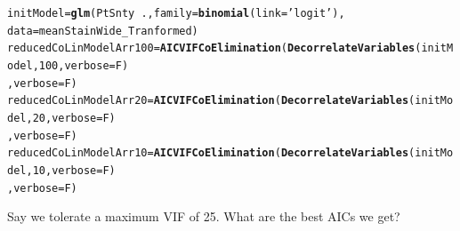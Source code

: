 \documentclass[a4paper]{article}\usepackage[]{graphicx}\usepackage[]{color}
\makeatletter
\newcommand{\hlnum}[1]{\textcolor[rgb]{0.686,0.059,0.569}{#1}}%
\newcommand{\hlstr}[1]{\textcolor[rgb]{0.192,0.494,0.8}{#1}}%
\newcommand{\hlopt}[1]{\textcolor[rgb]{0,0,0}{#1}}%
\newcommand{\hlstd}[1]{\textcolor[rgb]{0.345,0.345,0.345}{#1}}%
\newcommand{\hlkwb}[1]{\textcolor[rgb]{0.69,0.353,0.396}{#1}}%
\newcommand{\hlkwc}[1]{\textcolor[rgb]{0.333,0.667,0.333}{#1}}%
\newcommand{\hlkwd}[1]{\textcolor[rgb]{0.737,0.353,0.396}{\textbf{#1}}}%
\newenvironment{kframe}{%
 \def\at@end@of@kframe{}%
 \ifinner\ifhmode%
  \def\at@end@of@kframe{\end{minipage}}%
  \begin{minipage}{\columnwidth}%
 \fi\fi%
 \def\FrameCommand##1{\hskip\@totalleftmargin \hskip-\fboxsep
 \colorbox{shadecolor}{##1}\hskip-\fboxsep
     \hskip-\linewidth \hskip-\@totalleftmargin \hskip\columnwidth}%
 \MakeFramed {\advance\hsize-\width
   \@totalleftmargin\z@ \linewidth\hsize
   \@setminipage}}%
 {\par\unskip\endMakeFramed%
 \at@end@of@kframe}
\newenvironment{knitrout}{}{} %
\makeatother
\begin{document}
\begin{knitrout}
\color{fgcolor}\begin{kframe}
\begin{alltt}
\hlstd{initModel} \hlkwb{=} \hlkwd{glm}\hlstd{(PtSnty} \hlopt{~}\hlstd{.,}\hlkwc{family}\hlstd{=}\hlkwd{binomial}\hlstd{(}\hlkwc{link}\hlstd{=}\hlstr{'logit'}\hlstd{),}
                           \hlkwc{data}\hlstd{=meanStainWide_Tranformed)}
\hlstd{reducedCoLinModelArr100} \hlkwb{=} \hlkwd{AICVIFCoElimination}\hlstd{(}\hlkwd{DecorrelateVariables}\hlstd{(initModel,}\hlnum{100}\hlstd{,}\hlkwc{verbose}\hlstd{=F)}
                                              \hlstd{,}\hlkwc{verbose}\hlstd{=F)}
\hlstd{reducedCoLinModelArr20} \hlkwb{=} \hlkwd{AICVIFCoElimination}\hlstd{(}\hlkwd{DecorrelateVariables}\hlstd{(initModel,}\hlnum{20}\hlstd{,}\hlkwc{verbose}\hlstd{=F)}
                                             \hlstd{,}\hlkwc{verbose}\hlstd{=F)}
\hlstd{reducedCoLinModelArr10} \hlkwb{=} \hlkwd{AICVIFCoElimination}\hlstd{(}\hlkwd{DecorrelateVariables}\hlstd{(initModel,}\hlnum{10}\hlstd{,}\hlkwc{verbose}\hlstd{=F)}
                                             \hlstd{,}\hlkwc{verbose}\hlstd{=F)}
\end{alltt}
\end{kframe}
\end{knitrout}

Say we tolerate a maximum VIF of 25. What are the best AICs we get?
\end{document}
